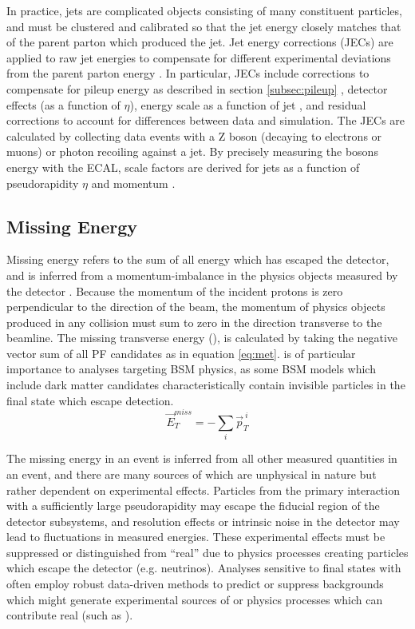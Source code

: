 In practice, jets are complicated objects consisting of many constituent particles, and must be clustered and calibrated so that the jet energy closely matches that of the parent parton which produced the jet. Jet energy corrections (JECs) are applied to raw jet energies to compensate for different experimental deviations from the parent parton energy \cite{Khachatryan:2016kdb,CMS-DP-2016-020}. In particular, JECs include corrections to compensate for pileup energy as described in section \ref{subsec:pileup} \cite{Cacciari:2007fd}, detector effects (as a function of $\eta$), energy scale as a function of jet \pt, and residual corrections to account for differences between data and simulation. The JECs are calculated by collecting data events with a Z boson (decaying to electrons or muons) or photon recoiling against a jet. By precisely measuring the bosons energy with the ECAL, scale factors are derived for jets as a function of pseudorapidity $\eta$ and momentum \pt. 

\subsection{Missing Energy}
\label{subsec:met}
Missing energy refers to the sum of all energy which has escaped the detector, and is inferred from a momentum-imbalance in the physics objects measured by the detector \cite{Chatrchyan:2011tn}. Because the momentum of the incident protons is zero perpendicular to the direction of the beam, the momentum of physics objects produced in any collision must sum to zero in the direction transverse to the beamline. The missing transverse energy (\MET), is calculated by taking the negative vector sum of all PF candidates as in equation \ref{eq:met}. \MET is of particular importance to analyses targeting BSM physics, as some BSM models which include dark matter candidates characteristically contain invisible particles in the final state which escape detection.
\begin{equation}
	\label{eq:met}
	\vec{E}_T^{miss}=-\sum_i^{} \vec{p}_T^{\: i}
\end{equation}

The missing energy in an event is inferred from all other measured quantities in an event, and there are many sources of \MET which are unphysical in nature but rather dependent on experimental effects. Particles from the primary interaction with a sufficiently large pseudorapidity may escape the fiducial region of the detector subsystems, and resolution effects or intrinsic noise in the detector may lead to fluctuations in measured energies. These experimental effects must be suppressed or distinguished from ``real'' \MET due to physics processes creating particles which escape the detector (e.g. neutrinos). Analyses sensitive to final states with \MET often employ robust data-driven methods to predict or suppress backgrounds which might generate experimental sources of \MET or physics processes which can contribute real \MET (such as \znunu).

